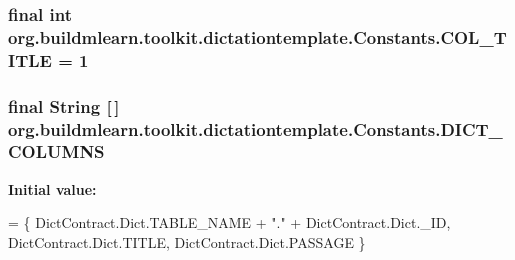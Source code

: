 \subsubsection[{\texorpdfstring{C\+O\+L\+\_\+\+T\+I\+T\+LE}{COL_TITLE}}]{\setlength{\rightskip}{0pt plus 5cm}final int org.\+buildmlearn.\+toolkit.\+dictationtemplate.\+Constants.\+C\+O\+L\+\_\+\+T\+I\+T\+LE = 1\hspace{0.3cm}{\ttfamily [static]}}\hypertarget{classorg_1_1buildmlearn_1_1toolkit_1_1dictationtemplate_1_1Constants_a9e22c3060e736b3863bc5f5f039b6942}{}\label{classorg_1_1buildmlearn_1_1toolkit_1_1dictationtemplate_1_1Constants_a9e22c3060e736b3863bc5f5f039b6942}
\subsubsection[{\texorpdfstring{D\+I\+C\+T\+\_\+\+C\+O\+L\+U\+M\+NS}{DICT_COLUMNS}}]{\setlength{\rightskip}{0pt plus 5cm}final String \mbox{[}$\,$\mbox{]} org.\+buildmlearn.\+toolkit.\+dictationtemplate.\+Constants.\+D\+I\+C\+T\+\_\+\+C\+O\+L\+U\+M\+NS\hspace{0.3cm}{\ttfamily [static]}}\hypertarget{classorg_1_1buildmlearn_1_1toolkit_1_1dictationtemplate_1_1Constants_a7d6d1315519509c36c62e79fdadafc56}{}\label{classorg_1_1buildmlearn_1_1toolkit_1_1dictationtemplate_1_1Constants_a7d6d1315519509c36c62e79fdadafc56}
{\bfseries Initial value\+:}
\begin{DoxyCode}
= \{
            DictContract.Dict.TABLE\_NAME + \textcolor{stringliteral}{"."} + DictContract.Dict.\_ID,
            DictContract.Dict.TITLE,
            DictContract.Dict.PASSAGE
    \}
\end{DoxyCode}
